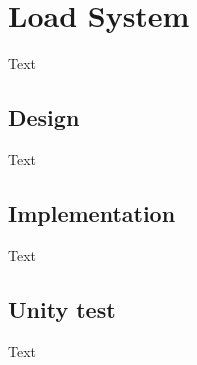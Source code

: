 \section{Load System}
Text

\subsection{Design}
Text

\subsection{Implementation}
Text

\subsection{Unity test}
Text